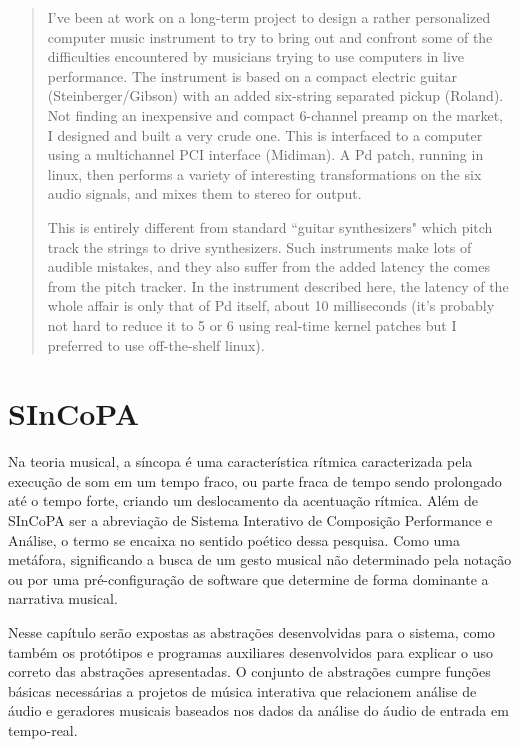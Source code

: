 \documentclass{ppgmus}
\begin{document}
\begin{quote}
 I've been at work on a long-term project to design a rather personalized computer music instrument to try 
to bring out and confront some of the difficulties encountered by musicians trying to use computers in live 
performance. The instrument is based on a compact electric guitar (Steinberger/Gibson) with an added six-string 
separated pickup (Roland). Not finding an inexpensive and compact 6-channel preamp on the market, I designed and 
built a very crude one. This is interfaced to a computer using a multichannel PCI interface (Midiman). 
A Pd patch, running in linux, then performs a variety of interesting transformations on the six audio signals, 
and mixes them to stereo for output.

This is entirely different from standard ``guitar synthesizers" which pitch track the strings to drive synthesizers. 
Such instruments make lots of audible mistakes, and they also suffer from the added latency the comes from the pitch 
tracker. In the instrument described here, the latency of the whole affair is only that of Pd itself, about 10 
milliseconds (it's probably not hard to reduce it to 5 or 6 using real-time kernel patches but I preferred to use 
off-the-shelf linux). 
\end{quote}



\chapter{SInCoPA}
\label{chap:SInCoPA}


Na teoria musical, a síncopa é uma característica rítmica caracterizada pela execução de som em um tempo fraco, 
ou parte fraca de tempo sendo prolongado até o tempo forte, criando um deslocamento da acentuação rítmica. 
Além de SInCoPA ser a abreviação de Sistema Interativo de Composição Performance e Análise, o termo se encaixa
no sentido poético dessa pesquisa. Como uma metáfora, significando a busca de um gesto musical não determinado pela notação
ou por uma pré-configuração de software que determine de forma dominante a narrativa musical.


  Nesse capítulo serão expostas as abstrações desenvolvidas para o sistema, como também
os protótipos e programas auxiliares desenvolvidos para explicar o uso correto das 
abstrações apresentadas. O conjunto de abstrações cumpre funções básicas necessárias
a projetos de música interativa que relacionem análise de áudio e geradores musicais
baseados nos dados da análise do áudio de entrada em tempo-real.
\end{document}
